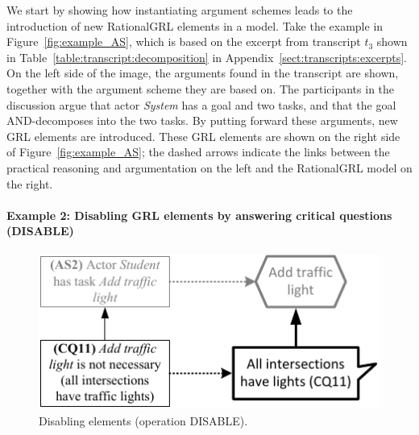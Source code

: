 We start by showing how instantiating argument schemes leads to the introduction of new RationalGRL elements in a model. Take the example in Figure~\ref{fig:example_AS}, which is based on the excerpt from transcript $t_3$ shown in Table~\ref{table:transcript:decomposition} in Appendix~\ref{sect:transcripts:excerpts}. On the left side of the image, the arguments found in the transcript are shown, together with the argument scheme they are based on. The participants in the discussion argue that actor \emph{System} has a goal and two tasks, and that the goal AND-decomposes into the two tasks. By putting forward these arguments, new GRL elements are introduced. These GRL elements are shown on the right side of Figure~\ref{fig:example_AS}; the dashed arrows indicate the links between the practical reasoning and argumentation on the left and the RationalGRL model on the right.


\paragraph{Example 2: Disabling GRL elements by answering critical questions (\textsf{DISABLE)}}

\begin{figure}[b]
\centering
\includegraphics[]{img/fig_example_disable.pdf}
\caption{Disabling elements (operation \textsf{DISABLE)}.}
\label{fig:example_disable}
\end{figure}

